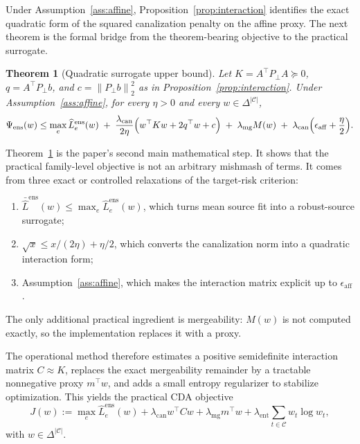 \documentclass{article}
\newtheorem{theorem}{Theorem}[section]
\theoremstyle{definition}
\newcommand{\cC}{\mathcal{C}}
\newcommand{\cda}{\textup{\textsc{CDA}}}
\newcommand{\simplex}{\Delta}
\newcommand{\norm}[1]{\left\lVert #1 \right\rVert}
\begin{document}
Under Assumption~\ref{ass:affine}, Proposition~\ref{prop:interaction} identifies the exact quadratic form of the squared canalization penalty on the affine proxy. The next theorem is the formal bridge from the theorem-bearing objective to the practical surrogate.

\begin{theorem}[Quadratic surrogate upper bound]
\label{thm:surrogate_upper}
Let \(K=A^\top P_\perp A\succeq 0\), \(q=A^\top P_\perp b\), and \(c=\norm{P_\perp b}_2^2\) as in Proposition~\ref{prop:interaction}. Under Assumption~\ref{ass:affine}, for every \(\eta>0\) and every \(w\in\simplex^{|\cC|}\),
\begin{equation}
\Psi_{\mathrm{ens}}(w)
\le
\max_{e}\widehat L_e^{\mathrm{ens}}(w)
\;+\;
\frac{\lambda_{\mathrm{can}}}{2\eta}\Bigl(w^\top K w + 2 q^\top w + c\Bigr)
\;+\;
\lambda_{\mathrm{mg}} M(w)
\;+\;
\lambda_{\mathrm{can}}\Bigl(\epsilon_{\mathrm{aff}} + \frac{\eta}{2}\Bigr).
\label{eq:surrogate_upper}
\end{equation}
\end{theorem}

Theorem~\ref{thm:surrogate_upper} is the paper's second main mathematical step. It shows that the practical family-level objective is not an arbitrary mishmash of terms. It comes from three exact or controlled relaxations of the target-risk criterion:
\begin{enumerate}[leftmargin=1.3em]
    \item \(\bar{\widehat L}^{\mathrm{ens}}(w)\le \max_e \widehat L_e^{\mathrm{ens}}(w)\), which turns mean source fit into a robust-source surrogate;
    \item \(\sqrt{x}\le x/(2\eta)+\eta/2\), which converts the canalization norm into a quadratic interaction form;
    \item Assumption~\ref{ass:affine}, which makes the interaction matrix explicit up to \(\epsilon_{\mathrm{aff}}\).
\end{enumerate}
The only additional practical ingredient is mergeability: \(M(w)\) is not computed exactly, so the implementation replaces it with a proxy.

The operational method therefore estimates a positive semidefinite interaction matrix \(C\approx K\), replaces the exact mergeability remainder by a tractable nonnegative proxy \(m^\top w\), and adds a small entropy regularizer to stabilize optimization. This yields the practical \cda{} objective
\begin{equation}
J(w)
:=
\max_{e}\widehat L_e^{\mathrm{ens}}(w)
+ \lambda_{\mathrm{can}} w^\top C w
+ \lambda_{\mathrm{mg}} m^\top w
+ \lambda_{\mathrm{ent}}\sum_{t\in\cC} w_t \log w_t,
\label{eq:practical_objective}
\end{equation}
with \(w\in\simplex^{|\cC|}\).
\end{document}
